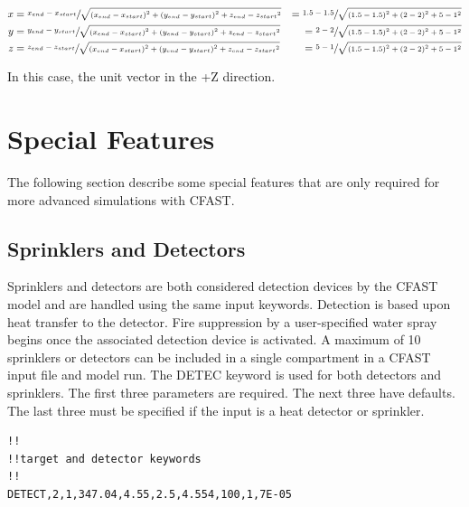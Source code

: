\begin{equation}
  \begin{aligned}
 x &= \sfrac{x_{end} - x_{start}}{\sqrt{{ \left( {x_{end} - x_{start}} \right) }^2 + { \left( {y_{end} - y_{start}} \right) }^2 + {z_{end} - z_{start}}^2}} &= \sfrac{1.5 - 1.5}{\sqrt{{ \left( {1.5 - 1.5} \right) }^2 + { \left( {2 - 2} \right) }^2 + {5 - 1}^2}} \\
 y &= \sfrac{y_{end} - y_{start}}{\sqrt{{ \left( {x_{end} - x_{start}} \right) }^2 + { \left( {y_{end} - y_{start}} \right) }^2 + {z_{end} - z_{start}}^2}} &= \sfrac{2 - 2}{\sqrt{{ \left( {1.5 - 1.5} \right) }^2 + { \left( {2 - 2} \right) }^2 + {5 - 1}^2}} \\
 z &= \sfrac{z_{end} - z_{start}}{\sqrt{{ \left( {x_{end} - x_{start}} \right) }^2 + { \left( {y_{end} - y_{start}} \right) }^2 + {z_{end} - z_{start}}^2}}  &= \sfrac{5 - 1}{\sqrt{{ \left( {1.5 - 1.5} \right) }^2 + { \left( {2 - 2} \right) }^2 + {5 - 1}^2}} \\
  \end{aligned}
\end{equation}

In this case, the unit vector in the +Z direction.

\newpage
\section{Special Features}

The following section describe some special features that are only required for more advanced simulations with CFAST.

\subsection{Sprinklers and Detectors}

Sprinklers and detectors are both considered detection devices by the CFAST model and are handled using the same input keywords.  Detection is based upon heat transfer to the detector. Fire suppression by a user-specified water spray begins once the associated detection device is activated.  A maximum of 10 sprinklers or detectors can be included in a single compartment in a CFAST input file and model run. The DETEC keyword is used for both detectors and sprinklers. The first three parameters are required. The next three have defaults. The last three must be specified if the input is a heat detector or sprinkler.

\begin{lstlisting}
!!
!!target and detector keywords
!!
DETECT,2,1,347.04,4.55,2.5,4.554,100,1,7E-05
\end{lstlisting}

